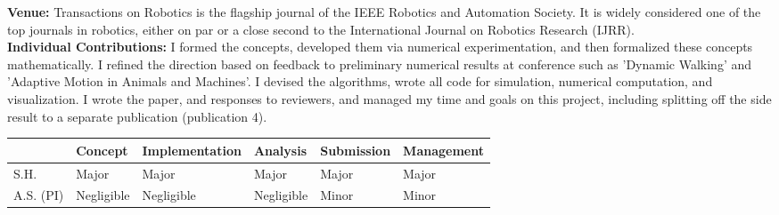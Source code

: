 \textbf{Venue: }
Transactions on Robotics is the flagship journal of the IEEE Robotics and Automation Society. It is widely considered one of the top journals in robotics, either on par or a close second to the International Journal on Robotics Research (IJRR). \\
\textbf{Individual Contributions: }
I formed the concepts, developed them via numerical experimentation, and then formalized these concepts mathematically. I refined the direction based on feedback to preliminary numerical results at conference such as 'Dynamic Walking' and 'Adaptive Motion in Animals and Machines'. I devised the algorithms, wrote all code for simulation, numerical computation, and visualization. I wrote the paper, and responses to reviewers, and managed my time and goals on this project, including splitting off the side result to a separate publication (publication 4).
\begin{table}[h!]
\begin{tabular}{l|l|l|l|l|l|}
\cline{2-6}
 \textbf{} & \textbf{Concept} & {\footnotesize \textbf{Implementation}} & \textbf{Analysis} & \textbf{Submission} & {\footnotesize \textbf{Management}} \\ \hline
\multicolumn{1}{|l|}{S.H.} & Major & Major & Major & Major & Major \\ \hline
\multicolumn{1}{|l|}{A.S. (PI)} & Negligible & Negligible & Negligible & Minor & Minor \\ \hline
\end{tabular}
\end{table}


